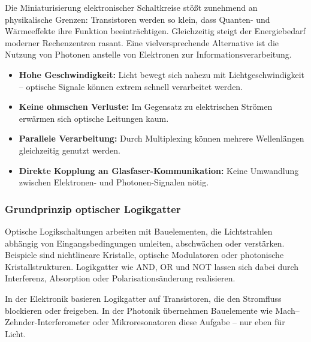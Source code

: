 Die Miniaturisierung elektronischer Schaltkreise stößt zunehmend an physikalische Grenzen: Transistoren werden so klein, dass Quanten- und Wärmeeffekte ihre Funktion beeinträchtigen. Gleichzeitig steigt der Energiebedarf moderner Rechenzentren rasant. Eine vielversprechende Alternative ist die Nutzung von Photonen anstelle von Elektronen zur Informationsverarbeitung.
\vspace{1em}
\begin{tcolorbox}[physikbox, title=Warum Photonen für Logikschaltungen interessant sind, label=box:optlogik_vorteile]
	\small
	\begin{itemize}
		\item \textbf{Hohe Geschwindigkeit:} Licht bewegt sich nahezu mit Lichtgeschwindigkeit – optische Signale können extrem schnell verarbeitet werden.
		\item \textbf{Keine ohmschen Verluste:} Im Gegensatz zu elektrischen Strömen erwärmen sich optische Leitungen kaum.
		\item \textbf{Parallele Verarbeitung:} Durch Multiplexing können mehrere Wellenlängen gleichzeitig genutzt werden.
		\item \textbf{Direkte Kopplung an Glasfaser-Kommunikation:} Keine Umwandlung zwischen Elektronen- und Photonen-Signalen nötig.
	\end{itemize}
\end{tcolorbox}

\subsubsection{Grundprinzip optischer Logikgatter}

Optische Logikschaltungen arbeiten mit Bauelementen, die Lichtstrahlen abhängig von Eingangsbedingungen umleiten, abschwächen oder verstärken. Beispiele sind nichtlineare Kristalle, optische Modulatoren oder photonische Kristallstrukturen.  
Logikgatter wie \textsc{AND}, \textsc{OR} und \textsc{NOT} lassen sich dabei durch Interferenz, Absorption oder Polarisationsänderung realisieren.
\vspace{1em}
\begin{tcolorbox}[didaktikbox, title=Von Elektronik zu Photonik]
	\label{box:optlogik_didaktik}
	\small
	In der Elektronik basieren Logikgatter auf Transistoren, die den Stromfluss blockieren oder freigeben. In der Photonik übernehmen Bauelemente wie Mach–Zehnder-Interferometer oder Mikroresonatoren diese Aufgabe – nur eben für Licht.
\end{tcolorbox}
\vspace{1em}
